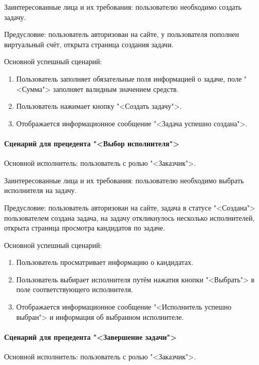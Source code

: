 Заинтересованные лица и их требования: пользователю необходимо создать задачу.

Предусловие: пользователь авторизован на сайте, у пользователя пополнен виртуальный счёт, открыта страница создания задачи.

Основной успешный сценарий: 

\begin{enumerate}
	\item Пользователь заполняет обязательные поля информацией о задаче, поле "<Сумма"> заполняет валидным значением средств.
	\item Пользователь нажимает кнопку "<Создать задачу">. 
	\item Отображается информационное сообщение "<Задача успешно создана">.
\end{enumerate}

\paragraph{Сценарий для прецедента "<Выбор исполнителя">}

Основной исполнитель: пользователь с ролью "<Заказчик">.

Заинтересованные лица и их требования: пользователю необходимо выбрать исполнителя на задачу.

Предусловие: пользователь авторизован на сайте, задача в статусе "<Создана"> пользователем создана задача, на задачу откликнулось несколько исполнителей, открыта страница просмотра кандидатов по задаче.

Основной успешный сценарий: 

\begin{enumerate}
	\item Пользователь просматривает информацию о кандидатах. 
	\item Пользователь выбирает исполнителя путём нажатия кнопки "<Выбрать"> в поле соответствующего исполнителя. 
	\item Отображается информационное сообщение "<Исполнитель успешно выбран"> и информация об выбранном исполнителе.
\end{enumerate}

\paragraph{Сценарий для прецедента "<Завершение задачи">}

Основной исполнитель: пользователь с ролью "<Заказчик">.

